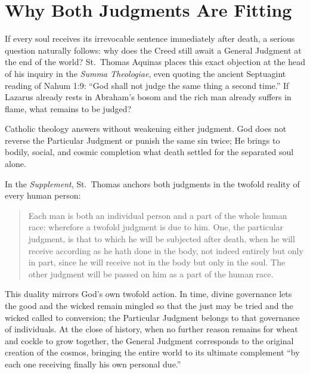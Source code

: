 \section{Why Both Judgments Are Fitting}

If every soul receives its irrevocable sentence immediately after death, a serious question naturally follows: why does the Creed still await a General Judgment at the end of the world? St.\ Thomas Aquinas places this exact objection at the head of his inquiry in the \textit{Summa Theologiae}, even quoting the ancient Septuagint reading of Nahum 1:9: ``God shall not judge the same thing a second time.'' If Lazarus already rests in Abraham's bosom and the rich man already suffers in flame, what remains to be judged?

Catholic theology answers without weakening either judgment. God does not reverse the Particular Judgment or punish the same sin twice; He brings to bodily, social, and cosmic completion what death settled for the separated soul alone.

In the \textit{Supplement}, St.\ Thomas anchors both judgments in the twofold reality of every human person:

\begin{quote}
Each man is both an individual person and a part of the whole human race: wherefore a twofold judgment is due to him. One, the particular judgment, is that to which he will be subjected after death, when he will receive according as he hath done in the body, not indeed entirely but only in part, since he will receive not in the body but only in the soul. The other judgment will be passed on him as a part of the human race.
\end{quote}

This duality mirrors God's own twofold action. In time, divine governance lets the good and the wicked remain mingled so that the just may be tried and the wicked called to conversion; the Particular Judgment belongs to that governance of individuals. At the close of history, when no further reason remains for wheat and cockle to grow together, the General Judgment corresponds to the original creation of the cosmos, bringing the entire world to its ultimate complement ``by each one receiving finally his own personal due.''

